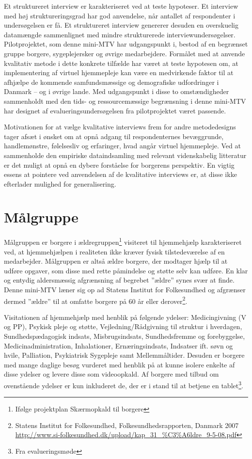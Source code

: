 Et struktureret interview er karakteriseret ved at teste hypoteser. Et interview med høj struktureringsgrad har god anvendelse, når antallet af respondenter i undersøgelsen er få. Et struktureret interview genererer desuden en overskuelig datamængde sammenlignet med mindre strukturerede interviewundersøgelser. Pilotprojektet, som denne mini-MTV har udgangspunkt i, bestod af en begrænset gruppe borgere, sygeplejersker og øvrige medarbejdere. Formålet med at anvende kvalitativ metode i dette konkrete tilfælde har været at teste hypotesen om, at implementering af virtuel hjemmepleje kan være en medvirkende faktor til at afhjælpe de kommende samfundsmæssige og demografiske udfordringer i Danmark – og i øvrige lande. Med udgangspunkt i disse to omstændigheder sammenholdt med den tids- og ressourcemæssige begrænsning i denne mini-MTV har designet af evalueringsundersøgelsen fra pilotprojektet været passende. 

Motivationen for at vælge kvalitative interviews frem for andre metodedesigns tager afsæt i ønsket om at opnå adgang til respondenternes bevæggrunde, handlemønstre, følelsesliv og erfaringer, hvad angår virtuel hjemmepleje. Ved at sammenholde den empiriske dataindsamling med relevant videnskabelig litteratur er det muligt at opnå en dybere forståelse for borgerens perspektiv. En vigtig essens at pointere ved anvendelsen af de kvalitative interviews er, at disse ikke efterlader mulighed for generalisering.

\section{Målgruppe}
Målgruppen er borgere i ældregruppen\footnote{Ifølge projektplan Skærmopkald til borgere} visiteret til hjemmehjælp karakteriseret ved, at hjemmehjælpen i realiteten ikke kræver fysisk tilstedeværelse af en medarbejder. Målgruppen er altså ældre borgere, der modtager hjælp til at udføre opgaver, som disse med rette påmindelse og støtte selv kan udføre. En klar og entydig aldersmæssig afgrænsning af begrebet ”ældre” synes svær at finde. Denne mini-MTV læner sig op ad Statens Institut for Folkesundhed og afgrænser dermed ”ældre” til at omfatte borgere på 60 år eller derover\footnote{Statens Institut for Folkesundhed, Folkesundhedsrapporten, Danmark 2007 \url{http://www.si-folkesundhed.dk/upload/kap_31_\%C3\%A6ldre_9-5-08.pdf}
}. 

Visitationen af hjemmehjælp med henblik på følgende ydelser: Medicingivning (V og PP), Psykisk pleje og støtte, Vejledning/Rådgivning til struktur i hverdagen, Sundhedspædagogisk indsats, Misbrugsindsats, Sundhedsfremme og forebyggelse, Medicinadministration, Inhalationer, Ernæringsindsats, Indsatser ift. søvn og hvile, Palliation, Psykiatrisk Sygepleje samt Mellemmåltider. Desuden er borgere med mange daglige besøg vurderet med henblik på at kunne isolere enkelte af disse ydelser og levere disse som videoopkald. Af borgere med tilbud om ovenstående ydelser er kun inkluderet de, der er i stand til at betjene en tablet\footnote{Fra evalueringsmøde}.

